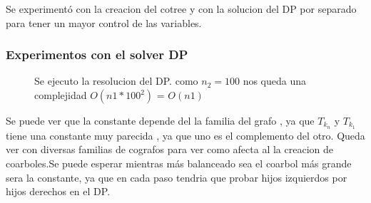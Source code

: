     Se experimentó con la creacion del cotree y con la solucion del DP por separado para 
     tener un mayor control de las variables.

 
   \subsubsection{ Experimentos con el solver DP}


    
    \begin{figure}[H]
        \centering
        \caption{Se ejecuto la resolucion del DP. como $n_2 = 100$ nos queda una complejidad $O(n1* 100^2)$ = $O(n1)$ }
        \label{fig:exp3:var-nym-base}
    \end{figure}

    Se puede ver que la constante depende del la familia del grafo , ya que $T_{k_n}$ y $T_{k_1}$ tiene una constante muy parecida , ya que uno es el complemento del otro. Queda ver con diversas familias de cografos para ver como afecta al la creacion de coarboles.Se puede esperar mientras más balanceado sea el coarbol más grande sera la constante, ya que en cada paso tendria que probar hijos izquierdos por hijos derechos en el DP.

    

